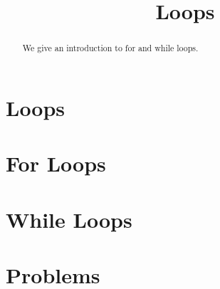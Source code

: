 \documentclass{ximera}
\title{Loops}
\begin{document}
  
\begin{abstract}  
We give an introduction to for and while loops.
\end{abstract}  
\maketitle

\section{Loops}

\section{For Loops}

\section{While Loops}

\section{Problems}

\begin{question}
\end{question}

\begin{question}
\end{question}
\end{document}
